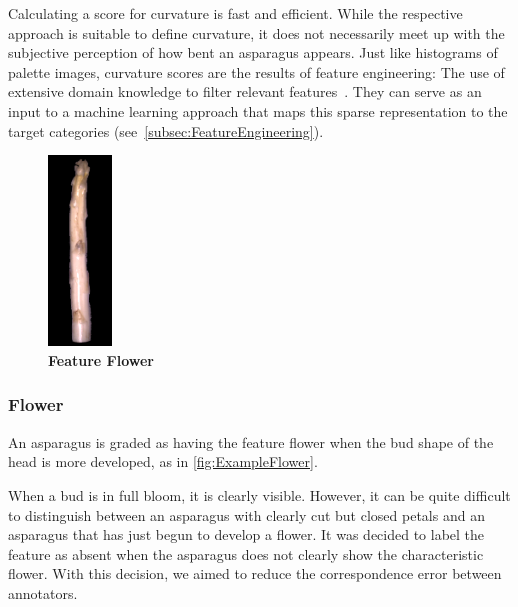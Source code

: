 \bigskip
Calculating a score for curvature is fast and efficient. While the respective approach is suitable to define curvature, it does not necessarily meet up with the subjective perception of how bent an asparagus appears. Just like histograms of palette images, curvature scores are the results of feature engineering: The use of extensive domain knowledge to filter relevant features~\citep{zheng2018feature}. They can serve as an input to a machine learning approach that maps this sparse representation to the target categories (see~\autoref{subsec:FeatureEngineering}).

\begin{figure}
  \begin{center}
    \includegraphics[width=0.15\textwidth]{Figures/chapter03/example_img_flower.png}
  \end{center}
  \vspace{-15pt}
  \caption[Example Image Feature Flower]{ \textbf{Feature Flower}}
  \label{fig:ExampleFlower}
\end{figure}

\subsubsection{Flower}
\label{subsec:Flower}

An asparagus is graded as having the feature flower when the bud shape of the head is more developed, as in \autoref{fig:ExampleFlower}.

When a bud is in full bloom, it is clearly visible. However, it can be quite difficult to distinguish between an asparagus with clearly cut but closed petals and an asparagus that has just begun to develop a flower. It was decided to label the feature as absent when the asparagus does not clearly show the characteristic flower. With this decision, we aimed to reduce the correspondence error between annotators.

